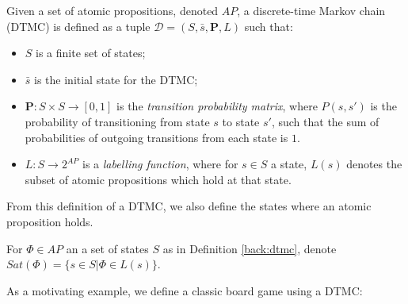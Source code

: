 \begin{definition}
\label{back:dtmc}
    Given a set of atomic propositions, denoted $AP$, a discrete-time Markov chain (DTMC) is defined as a tuple $\mathcal{D} = (S, \bar{s}, \mathbf{P}, L)$ such that:

    \begin{itemize}
        \item $S$ is a finite set of states;
        \item $\bar{s}$ is the initial state for the DTMC;
        \item $\mathbf{P} : S \times S \rightarrow [0,1]$ is the \emph{transition probability matrix}, where $P(s, s')$ is the probability of transitioning from state $s$ to state $s'$, such that the sum of probabilities of outgoing transitions from each state is $1$.
        \item $L: S \rightarrow 2^{AP}$ is a \emph{labelling function}, where for $s \in S$ a state, $L(s)$ denotes the subset of atomic propositions which hold at that state.
    \end{itemize}

\end{definition}


From this definition of a DTMC, we also define the states where an atomic proposition holds.

\begin{definition}
\label{back:sat}

    For $\Phi \in AP$ an a set of states $S$ as in Definition \ref{back:dtmc}, denote $Sat(\Phi) = \{s \in S | \Phi \in L(s)\}$.

\end{definition}


As a motivating example, we define a classic board game using a DTMC:


